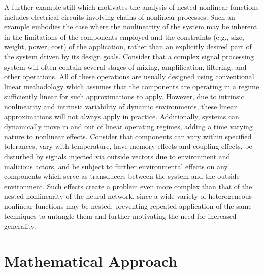 A further example still which motivates the analysis of nested nonlinear functions includes electrical circuits involving chains of nonlinear processes.  Such an example embodies the case where the nonlinearity of the system may be inherent in the limitations of the components employed and the constraints (e.g., size, weight, power, cost) of the application, rather than an explicitly desired part of the system driven by its design goals.  Consider that a complex signal processing system will often contain several stages of mixing, amplification, filtering, and other operations.  All of these operations are usually designed using conventional linear methodology which assumes that the components are operating in a regime sufficiently linear for such approximations to apply.  However, due to intrinsic nonlinearity and intrinsic variability of dynamic environments, these linear approximations will not always apply in practice. Additionally, systems can dynamically move in and out of linear operating regimes, adding a time varying nature to nonlinear effects.  Consider that components can vary within specified tolerances, vary with temperature, have memory effects and coupling effects, be disturbed by signals injected via outside vectors due to environment and malicious actors, and be subject to further environmental effects on any components which serve as transducers between the system and the outside environment.  Such effects create a problem even more complex than that of the nested nonlinearity of the neural network, since a wide variety of heterogeneous nonlinear functions may be nested, preventing repeated application of the same techniques to untangle them and further motivating the need for increased generality.

\section{Mathematical Approach}

